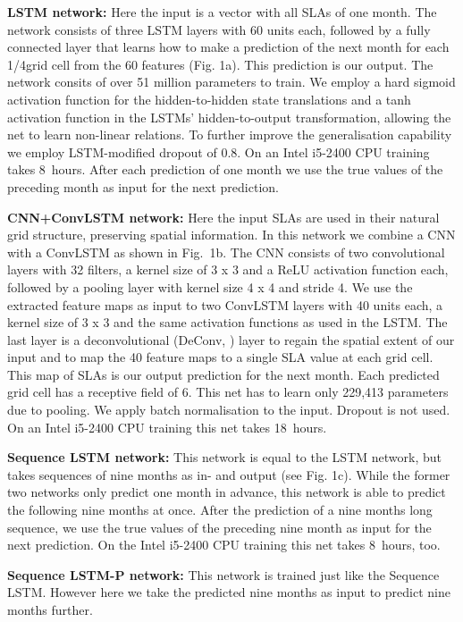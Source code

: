 \documentclass{article}
\begin{document}
{\bf LSTM network:}
Here the input is a vector with all SLAs of one month. The network consists of three LSTM layers with 60 units each, followed by a fully connected layer that learns how to make a prediction of the next month for each 1/4\degree grid cell from the 60 features (Fig. 1a). This prediction is our output. The network consits of over 51 million parameters to train. We employ a hard sigmoid activation function for the hidden-to-hidden state translations and a tanh activation function in the LSTMs' hidden-to-output transformation, allowing the net to learn non-linear relations. To further improve the generalisation capability we employ LSTM-modified dropout \cite{rnndrop} of 0.8. On an Intel i5-2400 CPU training takes 8~hours. After each prediction of one month we use the true values of the preceding month as input for the next prediction.

{\bf CNN+ConvLSTM network:} Here the input SLAs are used in their natural grid structure, preserving spatial information. In this network we combine a CNN with a ConvLSTM as shown in Fig.~1b. The CNN consists of two convolutional layers with 32 filters, a kernel size of 3 x 3 and a ReLU activation function each, followed by a pooling layer with kernel size 4 x 4 and stride 4.
We use the extracted feature maps as input to
two ConvLSTM layers with 40 units each, a kernel size of 3 x 3 and the same activation functions as used in the LSTM.
The last layer is a deconvolutional (DeConv, \cite{deconv}) layer to regain the spatial extent of our input and to map the 40 feature maps to a single SLA value at each grid cell. This map of SLAs is our output prediction for the next month. Each predicted grid cell has a receptive field of 6\degree. This net has to learn only 229,413 parameters due to pooling. We apply batch normalisation to the input. Dropout is not used. On an Intel i5-2400 CPU training this net takes 18~hours.

{\bf Sequence LSTM network:}
This network is equal to the LSTM network, but takes sequences of nine months as in- and output (see Fig. 1c). While the former two networks only predict one month in advance, this network is able to predict the following nine months at once. After the prediction of a nine months long sequence, we use the true values of the preceding nine month as input for the next prediction. On the Intel i5-2400 CPU training this net takes 8~hours, too.


{\bf Sequence LSTM-P network:} This network is trained just like the Sequence LSTM. However here we take the predicted nine months as input to predict nine months further.
\end{document}

